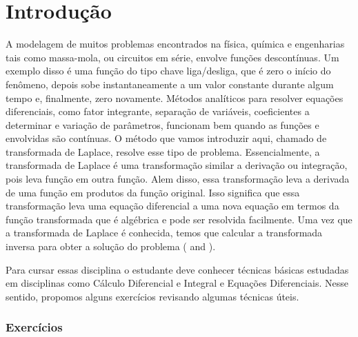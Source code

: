 

\chapter{Introdução}
A modelagem de muitos problemas encontrados na física, química e engenharias tais como massa-mola, ou circuitos em série, envolve funç\~{o}es descontínuas. Um exemplo disso é uma função do tipo chave liga/desliga, que é zero o início do fenômeno, depois sobe instantaneamente a um valor constante durante algum tempo e, finalmente, zero novamente. Métodos analíticos para resolver equações diferenciais, como fator integrante, separação de variáveis, coeficientes a determinar e variação de parâmetros, funcionam bem quando as funções e envolvidas são contínuas. O método que vamos introduzir aqui, chamado de transformada de Laplace, resolve esse tipo de problema. Essencialmente, a transformada de Laplace é uma transformação similar a derivação ou integração, pois leva função em outra função. Alem disso, essa transformação leva a derivada de uma função em produtos da função original. Isso significa que essa transformação leva uma equação diferencial a uma nova equação em termos da funç\~{a}o transformada que é algébrica e pode ser resolvida facilmente. Uma vez que a transformada de Laplace é conhecida, temos que calcular a transformada inversa para obter a solução do problema (\cite{ZILL} and \cite{STRAUCH}). 

Para cursar essas disciplina o estudante deve conhecer técnicas básicas estudadas em disciplinas como Cálculo Diferencial e Integral e Equações Diferenciais. Nesse sentido, propomos alguns exercícios revisando algumas técnicas úteis.
\subsection*{Exercícios}

